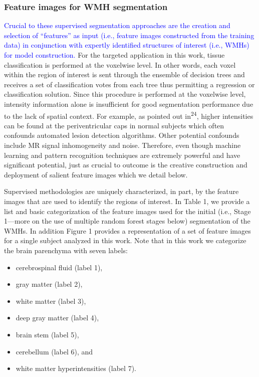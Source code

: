\documentclass[11pt,]{article}
\providecommand{\tightlist}{%
  \setlength{\itemsep}{0pt}\setlength{\parskip}{0pt}}
\begin{document}
\subsubsection{Feature images for WMH
segmentation}\label{feature-images-for-wmh-segmentation}

\textcolor{blue}{
Crucial to these supervised segmentation approaches are the creation and selection of
``features'' as input (i.e., feature images constructed from the training data)
in conjunction with expertly identified structures of interest
(i.e., WMHs) for model construction.} For the targeted application in
this work, tissue classification is performed at the voxelwise level. In
other words, each voxel within the region of interest is sent through
the ensemble of decision trees and receives a set of classification
votes from each tree thus permitting a regression or classification
solution. Since this procedure is performed at the voxelwise level,
intensity information alone is insufficient for good segmentation
performance due to the lack of spatial context. For example, as pointed
out in\textsuperscript{24}, higher intensities can be found at the
periventricular caps in normal subjects which often confounds automated
lesion detection algorithms. Other potential confounds include MR signal
inhomogeneity and noise. Therefore, even though machine learning and
pattern recognition techniques are extremely powerful and have
significant potential, just as crucial to outcome is the creative
construction and deployment of salient feature images which we detail
below.

Supervised methodologies are uniquely characterized, in part, by the
feature images that are used to identify the regions of interest. In
Table 1, we provide a list and basic categorization of the feature
images used for the initial (i.e., Stage 1---more on the use of multiple
random forest stages below) segmentation of the WMHs. In addition Figure
1 provides a representation of a set of feature images for a single
subject analyzed in this work. Note that in this work we categorize the
brain parenchyma with seven labels:

\begin{itemize}
\tightlist
\item
  cerebrospinal fluid (label 1),
\item
  gray matter (label 2),
\item
  white matter (label 3),
\item
  deep gray matter (label 4),
\item
  brain stem (label 5),
\item
  cerebellum (label 6), and
\item
  white matter hyperintensities (label 7).
\end{itemize}
\end{document}
